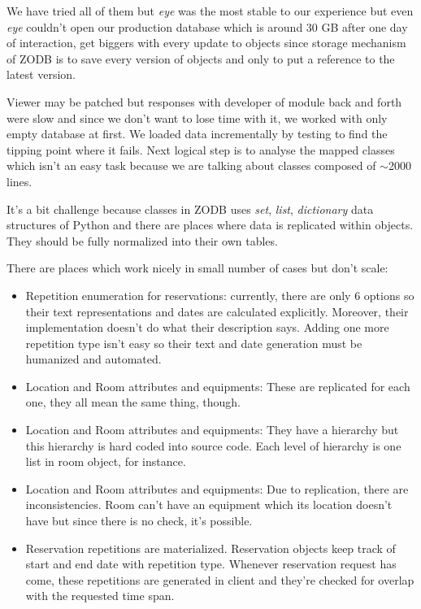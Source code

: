 We have tried all of them but \textit{eye} was the most stable to our experience but even \textit{eye} couldn't open our production database which is around 30 GB after one day of interaction, get biggers with every update to objects since storage mechanism of ZODB is to save every version of objects and only to put a reference to the latest version.

Viewer may be patched but responses with developer of module back and forth were slow and since we don't want to lose time with it, we worked with only empty database at first. We loaded data incrementally by testing to find the tipping point where it fails. Next logical step is to analyse the mapped classes which isn't an easy task because we are talking about classes composed of $\sim$2000 lines.

It's a bit challenge because classes in ZODB uses \textit{set}, \textit{list}, \textit{dictionary} data structures of Python and there are places where data is replicated within objects. They should be fully normalized into their own tables.

There are places which work nicely in small number of cases but don't scale:
\begin{itemize}
  \item Repetition enumeration for reservations: currently, there are only 6 options so their text representations and dates are calculated explicitly. Moreover, their implementation doesn't do what their description says. Adding one more repetition type isn't easy so their text and date generation must be humanized and automated.
  \item Location and Room attributes and equipments: These are replicated for each one, they all mean the same thing, though.
  \item Location and Room attributes and equipments: They have a hierarchy but this hierarchy is hard coded into source code. Each level of hierarchy is one list in room object, for instance.
  \item Location and Room attributes and equipments: Due to replication, there are inconsistencies. Room can't have an equipment which its location doesn't have but since there is no check, it's possible.
  \item Reservation repetitions are materialized. Reservation objects keep track of start and end date with repetition type. Whenever reservation request has come, these repetitions are generated in client and they're checked for overlap with the requested time span.
\end{itemize}

